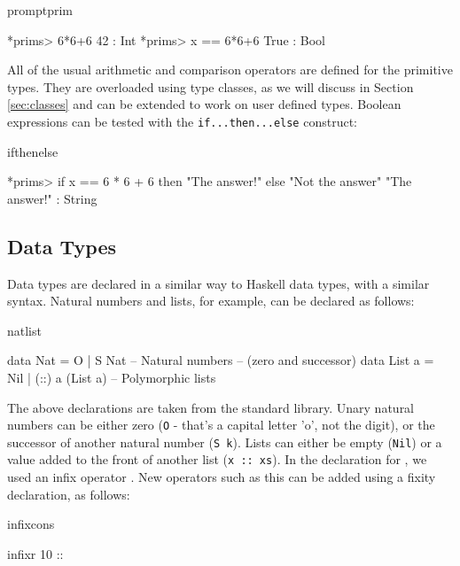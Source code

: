 \begin{SaveVerbatim}{promptprim}

*prims> 6*6+6
42 : Int
*prims> x == 6*6+6
True : Bool

\end{SaveVerbatim}

\noindent
All of the usual arithmetic and comparison operators are defined for the primitive
types. They are overloaded using type classes, as we will discuss in Section
\ref{sec:classes} and can be extended to work on user defined types.
Boolean expressions can be tested with the \texttt{if...then...else} construct:

\begin{SaveVerbatim}{ifthenelse}

*prims> if x == 6 * 6 + 6 then "The answer!" else "Not the answer"
"The answer!" : String

\end{SaveVerbatim}

\subsection{Data Types}

Data types are declared in a similar way to Haskell data types, with a similar
syntax. Natural numbers and lists, for example, can be declared as follows:

\begin{SaveVerbatim}{natlist}

data Nat    = O   | S Nat           -- Natural numbers
                                    -- (zero and successor)
data List a = Nil | (::) a (List a) -- Polymorphic lists

\end{SaveVerbatim}

\noindent
The above declarations are taken from the standard library. Unary natural
numbers can be either zero (\texttt{O} - that's a capital letter 'o', not the digit), or
the successor of another natural number (\texttt{S k}). 
Lists can either be empty (\texttt{Nil})
or a value added to the front of another list (\texttt{x :: xs}).
In the declaration for , we used an infix operator \tDC{::}. New operators
such as this can be added using a fixity declaration, as follows:

\begin{SaveVerbatim}{infixcons}

infixr 10 :: 

\end{SaveVerbatim}

